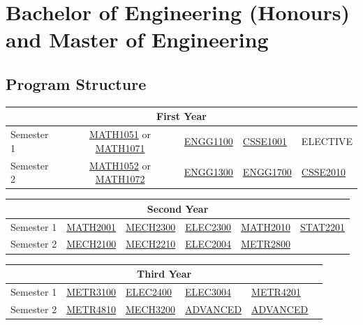 \documentclass[a4paper,12pt]{report}
\begin{document}
\newpage

\section{Bachelor of Engineering (Honours) and Master of Engineering}
\subsection{Program Structure}
\renewcommand{\arraystretch}{1.5}
\begin{table}[H]
    \centering
    \begin{tabular}{| m{6em} | m{5em} m{5em} m{5em} m{5em} m{5em} |}
        \hline
        \multicolumn{6}{|c|}{\bfseries First Year} \\
        \hline
        Semester 1 & \multicolumn{2}{c}{\hyperlink{MATH1051}{MATH1051} or \hyperlink{MATH1071}{MATH1071}} & \hyperlink{ENGG1100}{ENGG1100} & \hyperlink{CSSE1001}{CSSE1001} & ELECTIVE \\
        Semester 2 & \multicolumn{2}{c}{\hyperlink{MATH1052}{MATH1052} or \hyperlink{MATH1072}{MATH1072}} & \hyperlink{ENGG1300}{ENGG1300} & \hyperlink{ENGG1700}{ENGG1700} & \hyperlink{CSSE2010}{CSSE2010} \\
        \hline
    \end{tabular}
\end{table}
\begin{table}[H]
    \centering
    \begin{tabular}{| m{6em} | m{5em} m{5em} m{5em} m{5em} m{5em} |}
        \hline
        \multicolumn{6}{|c|}{\bfseries Second Year} \\
        \hline
        Semester 1 & \hyperlink{MATH2001}{MATH2001} & \hyperlink{MECH2300}{MECH2300} & \hyperlink{ELEC2300}{ELEC2300} & \hyperlink{MATH2010}{MATH2010} & \hyperlink{STAT2201}{STAT2201} \\
        Semester 2 & \hyperlink{MECH2100}{MECH2100} & \hyperlink{MECH2210}{MECH2210} & \hyperlink{ELEC2004}{ELEC2004} & \hyperlink{METR2800}{METR2800} & \\
        \hline
    \end{tabular}
\end{table}
\begin{table}[H]
    \centering
    \begin{tabular}{| m{6em} | m{5em} m{5em} m{5em} m{5em} m{5em} |}
        \hline
        \multicolumn{6}{|c|}{\bfseries Third Year} \\
        \hline
        Semester 1 & \hyperlink{METR3100}{METR3100} & \hyperlink{ELEC2400}{ELEC2400} & \hyperlink{ELEC3004}{ELEC3004} & \hyperlink{METR4201}{METR4201} & \\
        Semester 2 & \hyperlink{METR4810}{METR4810} & \hyperlink{MECH3200}{MECH3200} & \hyperlink{ADVANCED}{ADVANCED} & \hyperlink{ADVANCED}{ADVANCED} & \\
        \hline
    \end{tabular}
\end{table}
\end{document}

